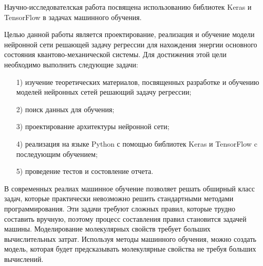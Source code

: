\intro
Научно-исследователская работа посвящена использованию библиотек Keras и TensorFlow в задачах машинного обучения.

Целью данной работы является проектирование, реализация и обучение модели нейронной сети решающей задачу регрессии для нахождения энергии основного состояния квантово-механической системы. Для достижения этой цели необходимо выполнить следующие задачи:

\begin{enumerate}
    \item [1)] изучение теоретических материалов, посвященных разработке и обучению моделей нейронных сетей решающий задачу регрессии;
    \item [2)] поиск данных для обучения;
    \item [3)] проектирование архитектуры нейронной сети;
    \item [4)] реализация на языке Python с помощью библиотек Keras и TensorFlow c последующим обучением;
    \item [5)] проведение тестов и состовление отчета.
\end{enumerate}



В современных реалиах машинное обучение позволяет решать обширный
класс задач, которые практически невозможно решить стандартными методами
программирования. Эти задачи требуют сложных правил, которые трудно составить вручную, поэтому процесс составления правил становится задачей машины. Моделирование молекулярных свойств требует больших вычислительных затрат. Используя методы машинного обучения, можно создать модель, которая будет предсказывать молекулярные свойства не требуя больших вычислений.
